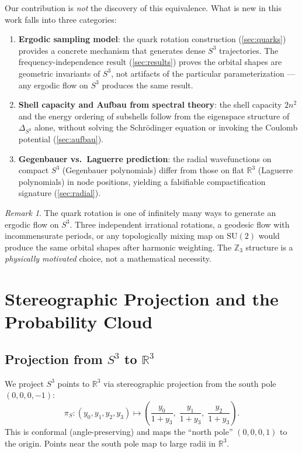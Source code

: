 \documentclass[12pt, a4paper]{article}
\theoremstyle{definition}
\theoremstyle{remark}
\newtheorem{remark}[theorem]{Remark}
\newcommand{\Sthree}{S^3}
\newcommand{\SU}{\mathrm{SU}(2)}
\newcommand{\R}{\mathbb{R}}
\newcommand{\Z}{\mathbb{Z}}
\newcommand{\lap}{\Delta_{\Sthree}}
\begin{document}
Our contribution is \emph{not} the discovery of this equivalence. What is
new in this work falls into three categories:
\begin{enumerate}[nosep]
  \item \textbf{Ergodic sampling model}: the quark rotation construction
    (\cref{sec:quarks}) provides a concrete mechanism that generates dense
    $\Sthree$ trajectories. The frequency-independence result
    (\cref{sec:results}) proves the orbital shapes are geometric invariants
    of $\Sthree$, not artifacts of the particular parameterization --- any
    ergodic flow on $\Sthree$ produces the same result.
  \item \textbf{Shell capacity and Aufbau from spectral theory}: the shell
    capacity $2n^2$ and the energy ordering of subshells follow from the
    eigenspace structure of~$\lap$ alone, without solving the Schr\"odinger
    equation or invoking the Coulomb potential (\cref{sec:aufbau}).
  \item \textbf{Gegenbauer vs.\ Laguerre prediction}: the radial
    wavefunctions on compact $\Sthree$ (Gegenbauer polynomials) differ from
    those on flat $\R^3$ (Laguerre polynomials) in node positions, yielding
    a falsifiable compactification signature (\cref{sec:radial}).
\end{enumerate}

\begin{remark}
The quark rotation is one of infinitely many ways to generate an ergodic
flow on $\Sthree$. Three independent irrational rotations, a geodesic flow
with incommensurate periods, or any topologically mixing map on $\SU$ would
produce the same orbital shapes after harmonic weighting. The $\Z_3$
structure is a \emph{physically motivated} choice, not a mathematical
necessity.
\end{remark}


\section{Stereographic Projection and the Probability Cloud}
\label{sec:projection}

\subsection{Projection from $\Sthree$ to $\R^3$}

We project $\Sthree$ points to $\R^3$ via stereographic projection from
the south pole $(0, 0, 0, -1)$:
\begin{equation}
  \pi_S : (y_0, y_1, y_2, y_3) \mapsto
  \left(\frac{y_0}{1+y_3},\; \frac{y_1}{1+y_3},\; \frac{y_2}{1+y_3}\right).
  \label{eq:stereo}
\end{equation}
This is conformal (angle-preserving) and maps the ``north pole''
$(0,0,0,1)$ to the origin. Points near the south pole map to large radii
in $\R^3$.
\end{document}
